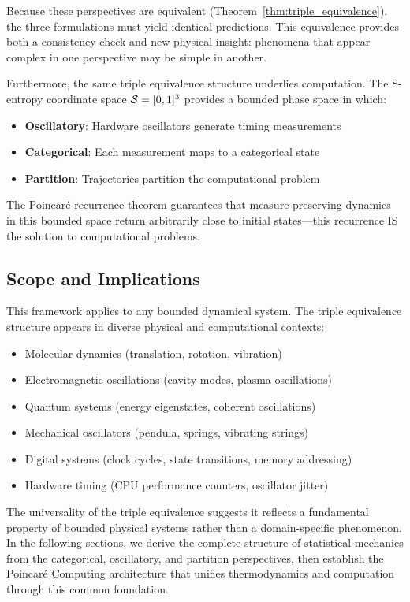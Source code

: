 Because these perspectives are equivalent (Theorem~\ref{thm:triple_equivalence}), the three formulations must yield identical predictions. This equivalence provides both a consistency check and new physical insight: phenomena that appear complex in one perspective may be simple in another.

Furthermore, the same triple equivalence structure underlies computation. The S-entropy coordinate space $\mathcal{S} = [0,1]^3$ provides a bounded phase space in which:
\begin{itemize}
\item \textbf{Oscillatory}: Hardware oscillators generate timing measurements
\item \textbf{Categorical}: Each measurement maps to a categorical state
\item \textbf{Partition}: Trajectories partition the computational problem
\end{itemize}

The Poincar\'e recurrence theorem guarantees that measure-preserving dynamics in this bounded space return arbitrarily close to initial states---this recurrence IS the solution to computational problems.

\subsection{Scope and Implications}

This framework applies to any bounded dynamical system. The triple equivalence structure appears in diverse physical and computational contexts:
\begin{itemize}
\item Molecular dynamics (translation, rotation, vibration)
\item Electromagnetic oscillations (cavity modes, plasma oscillations)
\item Quantum systems (energy eigenstates, coherent oscillations)
\item Mechanical oscillators (pendula, springs, vibrating strings)
\item Digital systems (clock cycles, state transitions, memory addressing)
\item Hardware timing (CPU performance counters, oscillator jitter)
\end{itemize}

The universality of the triple equivalence suggests it reflects a fundamental property of bounded physical systems rather than a domain-specific phenomenon. In the following sections, we derive the complete structure of statistical mechanics from the categorical, oscillatory, and partition perspectives, then establish the Poincar\'e Computing architecture that unifies thermodynamics and computation through this common foundation.
